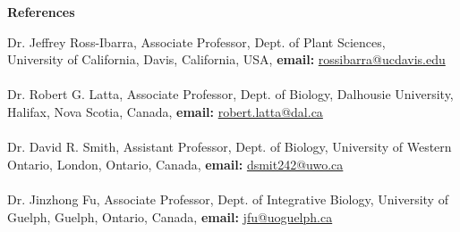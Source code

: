 \documentclass[a4paper,12pt,final]{memoir}
\newcommand{\SmallSep}{\vspace{0.5em}}
\newenvironment{Contact Information}
	{\ignorespaces\textbf{\color{MidnightBlue} Contact Information}}
	{\Sep\ignorespacesafterend}
\newcommand{\CVSection}[1]
	{\Large\textbf{#1}\par
	\SmallSep\normalsize\normalfont}
\begin{document}
\CVSection{References}
Dr. Jeffrey Ross-Ibarra, Associate Professor, Dept. of Plant Sciences, \\
University of California, Davis, California, USA, \textbf{email:} \href{rossibarra@ucdavis.edu}{rossibarra@ucdavis.edu}\\
\\Dr. Robert G. Latta, Associate Professor, Dept. of Biology, Dalhousie University, Halifax, Nova Scotia, Canada, \textbf{email:} \href{robert.latta@dal.ca}{robert.latta@dal.ca}\\
\\Dr. David R. Smith, Assistant Professor, Dept. of Biology, University of Western Ontario, London, Ontario, Canada, \textbf{email:} \href{dsmit242@uwo.ca}{dsmit242@uwo.ca}\\
\\Dr. Jinzhong Fu, Associate Professor, Dept. of Integrative Biology, University of Guelph, Guelph, Ontario, Canada, \textbf{email:} \href{jfu@uoguelph.ca}{jfu@uoguelph.ca}


\end{document}
